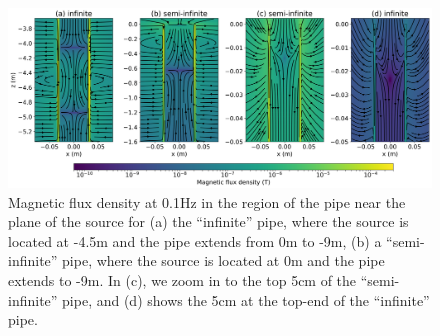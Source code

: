 \begin{figure}
    \begin{center}
    \includegraphics[width=\columnwidth]{figures/casing_software/AugustinBfields.png}
    \end{center}
\caption{
    Magnetic flux density at 0.1Hz in the region of the pipe near the plane of the source for
    (a) the ``infinite'' pipe, where the source is located at -4.5m and the pipe extends from 0m to -9m,
    (b) a ``semi-infinite'' pipe, where the source is located at 0m and the pipe extends to -9m.
    In (c), we zoom in to the top 5cm of the ``semi-infinite'' pipe,
    and (d) shows the 5cm at the top-end of the ``infinite'' pipe.
}
\label{fig:AugustinBfields}
\end{figure}
